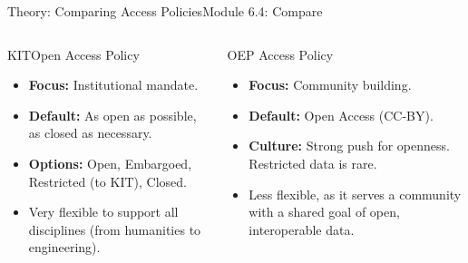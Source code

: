 \begin{frame}{Theory: Comparing Access Policies}{Module 6.4: Compare}
    \begin{columns}
        \begin{block}{KITOpen Access Policy}
            \begin{itemize}
                \item \textbf{Focus:} Institutional mandate.
                \item \textbf{Default:} As open as possible, as closed as necessary.
                \item \textbf{Options:} Open, Embargoed, Restricted (to KIT), Closed.
                \item Very flexible to support all disciplines (from humanities to engineering).
            \end{itemize}
        \end{block}
        
        \begin{block}{OEP Access Policy}
            \begin{itemize}
                \item \textbf{Focus:} Community building.
                \item \textbf{Default:} Open Access (CC-BY).
                \item \textbf{Culture:} Strong push for openness. Restricted data is rare.
                \item Less flexible, as it serves a community with a shared goal of open, interoperable data.
            \end{itemize}
        \end{block}
    \end{columns}
\end{frame}

